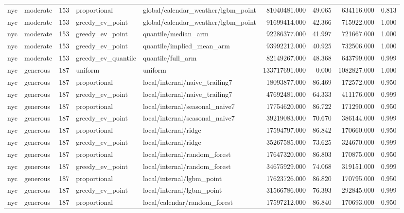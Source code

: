 \begin{tabular}{llrllrrrr}
nyc & moderate & 153 & proportional & global/calendar\_weather/lgbm\_point & 81040481.000 & 49.065 & 634116.000 & 0.813 \\
nyc & moderate & 153 & greedy\_ev\_point & global/calendar\_weather/lgbm\_point & 91699414.000 & 42.366 & 715922.000 & 1.000 \\
nyc & moderate & 153 & greedy\_ev\_point & quantile/median\_arm & 92286377.000 & 41.997 & 721667.000 & 1.000 \\
nyc & moderate & 153 & greedy\_ev\_point & quantile/implied\_mean\_arm & 93992212.000 & 40.925 & 732506.000 & 1.000 \\
nyc & moderate & 153 & greedy\_ev\_quantile & quantile/full\_arm & 82149267.000 & 48.368 & 643799.000 & 0.999 \\
nyc & generous & 187 & uniform & uniform & 133717691.000 & 0.000 & 1082827.000 & 1.000 \\
nyc & generous & 187 & proportional & local/internal/naive\_trailing7 & 18093877.000 & 86.469 & 172572.000 & 0.950 \\
nyc & generous & 187 & greedy\_ev\_point & local/internal/naive\_trailing7 & 47692481.000 & 64.333 & 411176.000 & 0.999 \\
nyc & generous & 187 & proportional & local/internal/seasonal\_naive7 & 17754620.000 & 86.722 & 171290.000 & 0.950 \\
nyc & generous & 187 & greedy\_ev\_point & local/internal/seasonal\_naive7 & 39219083.000 & 70.670 & 386144.000 & 0.999 \\
nyc & generous & 187 & proportional & local/internal/ridge & 17594797.000 & 86.842 & 170660.000 & 0.950 \\
nyc & generous & 187 & greedy\_ev\_point & local/internal/ridge & 35267585.000 & 73.625 & 324670.000 & 0.999 \\
nyc & generous & 187 & proportional & local/internal/random\_forest & 17647320.000 & 86.803 & 170875.000 & 0.950 \\
nyc & generous & 187 & greedy\_ev\_point & local/internal/random\_forest & 34675929.000 & 74.068 & 319151.000 & 0.999 \\
nyc & generous & 187 & proportional & local/internal/lgbm\_point & 17623726.000 & 86.820 & 170795.000 & 0.950 \\
nyc & generous & 187 & greedy\_ev\_point & local/internal/lgbm\_point & 31566786.000 & 76.393 & 292845.000 & 0.999 \\
nyc & generous & 187 & proportional & local/calendar/random\_forest & 17597212.000 & 86.840 & 170693.000 & 0.950 \\

\end{tabular}
